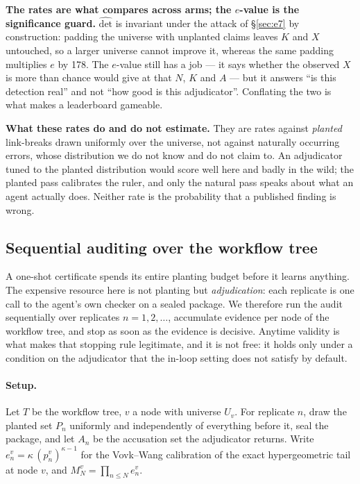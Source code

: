 \documentclass[10pt]{article}
\newcommand{\RM}[1]{{#1}}
\begin{document}
\textbf{The rates are what compares across arms; the $e$-value is the
significance guard.} $\widehat{\mathrm{det}}$ is invariant under the attack of
\S\ref{sec:e7} by construction: padding the universe with unplanted claims
leaves $K$ and $X$ untouched, so a larger universe cannot improve it, whereas
the same padding multiplies $e$ by \RM{178}. The $e$-value still has a job ---
it says whether the observed $X$ is more than chance would give at that $N$, $K$
and $A$ --- but it answers ``is this detection real'' and not ``how good is this
adjudicator''. Conflating the two is what makes a leaderboard gameable.

\textbf{What these rates do and do not estimate.} They are rates against
\emph{planted} link-breaks drawn uniformly over the universe, not against
naturally occurring errors, whose distribution we do not know and do not claim
to. An adjudicator tuned to the planted distribution would score well here and
badly in the wild; the planted pass calibrates the ruler, and only the natural
pass speaks about what an agent actually does. Neither rate is the probability
that a published finding is wrong.

\subsection{Sequential auditing over the workflow tree}
\label{sec:hierseq}

A one-shot certificate spends its entire planting budget before it learns
anything. The expensive resource here is not planting but \emph{adjudication}:
each replicate is one call to the agent's own checker on a sealed package. We
therefore run the audit sequentially over replicates $n=1,2,\dots$, accumulate
evidence per node of the workflow tree, and stop as soon as the evidence is
decisive. Anytime validity is what makes that stopping rule legitimate, and it
is not free: it holds only under a condition on the adjudicator that the
in-loop setting does not satisfy by default.

\paragraph{Setup.} Let $T$ be the workflow tree, $v$ a node with universe $U_v$.
For replicate $n$, draw the planted set $P_n$ uniformly and independently of
everything before it, seal the package, and let $A_n$ be the accusation set the
adjudicator returns. Write $e^v_n = \kappa\,(p^v_n)^{\kappa-1}$ for the
Vovk--Wang calibration of the exact hypergeometric tail at node $v$, and
$M^v_N = \prod_{n \le N} e^v_n$.
\end{document}
